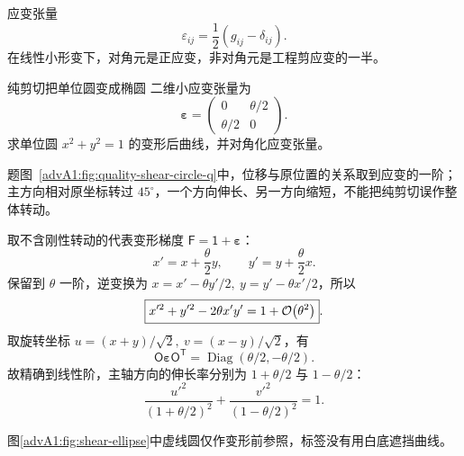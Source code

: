 \begin{advdefinition}{应变张量}\label{advA1:def:strain}
\[
 \varepsilon_{ij}=\frac12(g_{ij}-\delta_{ij}).
\]
在线性小形变下，对角元是正应变，非对角元是工程剪应变的一半。
\end{advdefinition}

\begin{advexamplebox}{纯剪切把单位圆变成椭圆}\label{advA1:ex:shear-circle}
二维小应变张量为
\[
 \bm\varepsilon=\begin{pmatrix}0&\theta/2\\\theta/2&0\end{pmatrix}.
\]
求单位圆 $x^2+y^2=1$ 的变形后曲线，并对角化应变张量。

\begin{qualityfigure}
\label{advA1:fig:quality-shear-circle-q}
\end{qualityfigure}
\end{advexamplebox}
\begin{advsolution}题图~\ref{advA1:fig:quality-shear-circle-q}中，位移与原位置的关系取到应变的一阶；主方向相对原坐标转过 $45^\circ$，一个方向伸长、另一方向缩短，不能把纯剪切误作整体转动。

取不含刚性转动的代表变形梯度
$\mathsf F=\mathsf1+\bm\varepsilon$：
\[
 x'=x+\frac\theta2y,\qquad
 y'=y+\frac\theta2x.
\]
保留到 $\theta$ 一阶，逆变换为
$x=x'-\theta y'/2,\ y=y'-\theta x'/2$，所以
\[
 \boxed{x'^2+y'^2-2\theta x'y'=1+\mathcal O\!\left(\theta^2\right)}.
\]
取旋转坐标
$u=(x+y)/\sqrt2,\ v=(x-y)/\sqrt2$，有
\[
 \mathsf O\bm\varepsilon\mathsf O^{\mathsf T}
 =\operatorname{Diag}(\theta/2,-\theta/2).
\]
故精确到线性阶，主轴方向的伸长率分别为 $1+\theta/2$ 与
$1-\theta/2$：
\[
 \frac{u'^2}{(1+\theta/2)^2}
 +\frac{v'^2}{(1-\theta/2)^2}=1.
\]
\begin{center}\begin{minipage}{\linewidth}\centering
{}
\label{advA1:fig:shear-ellipse}
\end{minipage}\end{center}
图\ref{advA1:fig:shear-ellipse}中虚线圆仅作变形前参照，标签没有用白底遮挡曲线。
\end{advsolution}


